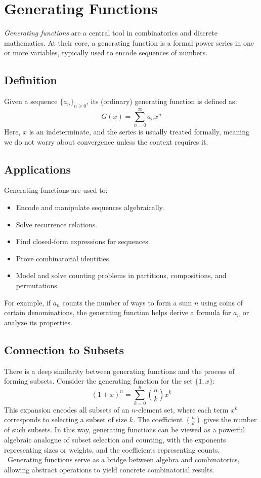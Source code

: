 \newpage
\section{Generating Functions}

\emph{Generating functions} are a central tool in 
combinatorics and discrete mathematics. At their core, a 
generating function is a formal power series in one or more variables, 
typically used to encode sequences of numbers.

\subsection{Definition}

Given a sequence \( {\{a_n\}}_{n \ge 0} \), its (ordinary) generating function is defined as:
\[
G(x) = \sum_{n=0}^{\infty} a_n x^n
\]
Here, \( x \) is an indeterminate, and the series is usually treated formally, meaning we do not worry about convergence unless the context requires it.

\subsection{Applications}

Generating functions are used to:
\begin{itemize}[label=\(-\)]
  \item Encode and manipulate sequences algebraically.
  \item Solve recurrence relations.
  \item Find closed-form expressions for sequences.
  \item Prove combinatorial identities.
  \item Model and solve counting problems in partitions, compositions, and permutations.
\end{itemize}

For example, if \( a_n \) counts the number of ways to form a sum \( n \) using coins of certain denominations, the generating function helps derive a formula for \( a_n \) or analyze its properties.

\subsection{Connection to Subsets}

There is a deep similarity between generating functions and the process of forming subsets. Consider the generating function for the set \( \{1, x\} \):
\[
{(1 + x)}^n = \sum_{k=0}^n \binom{n}{k} x^k
\]
This expansion encodes all subsets of an \( n \)-element set, where each term \( x^k \) corresponds to selecting a subset of size \( k \). The coefficient \( \binom{n}{k} \) gives the number of such subsets.
\newline
In this way, generating functions can be viewed as a powerful algebraic analogue of subset selection and counting, with the exponents representing sizes or weights, and the coefficients representing counts.
\\\
Generating functions serve as a bridge between algebra and combinatorics, allowing abstract operations to yield concrete combinatorial results.

